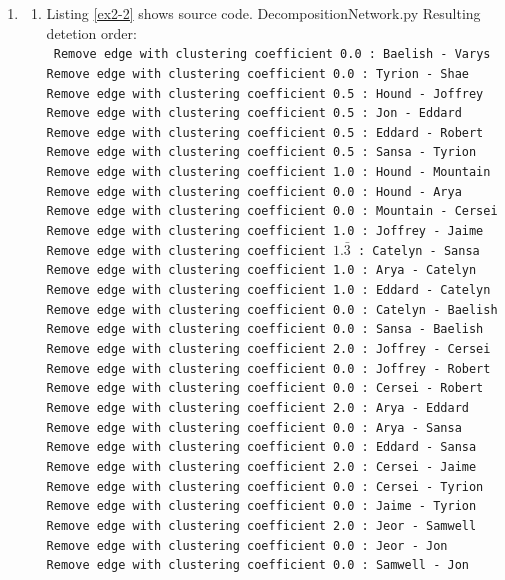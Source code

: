\documentclass[10pt,a4paper]{article}
\begin{document}
\begin{enumerate}
\item
\begin{enumerate}
\item Listing \ref{ex2-2} shows source code.
 {DecompositionNetwork.py}
Resulting detetion order:\\
\texttt{
Remove edge with clustering coefficient 0.0 :	 Baelish - Varys\\
Remove edge with clustering coefficient 0.0 :	 Tyrion - Shae\\
Remove edge with clustering coefficient 0.5 :	 Hound - Joffrey\\
Remove edge with clustering coefficient 0.5 :	 Jon - Eddard\\
Remove edge with clustering coefficient 0.5 :	 Eddard - Robert\\
Remove edge with clustering coefficient 0.5 :	 Sansa - Tyrion\\
Remove edge with clustering coefficient 1.0 :	 Hound - Mountain\\
Remove edge with clustering coefficient 0.0 :	 Hound - Arya\\
Remove edge with clustering coefficient 0.0 :	 Mountain - Cersei\\
Remove edge with clustering coefficient 1.0 :	 Joffrey - Jaime\\
Remove edge with clustering coefficient $1.\bar{3}$ :	 Catelyn - Sansa\\
Remove edge with clustering coefficient 1.0 :	 Arya - Catelyn\\
Remove edge with clustering coefficient 1.0 :	 Eddard - Catelyn\\
Remove edge with clustering coefficient 0.0 :	 Catelyn - Baelish\\
Remove edge with clustering coefficient 0.0 :	 Sansa - Baelish\\
Remove edge with clustering coefficient 2.0 :	 Joffrey - Cersei\\
Remove edge with clustering coefficient 0.0 :	 Joffrey - Robert\\
Remove edge with clustering coefficient 0.0 :	 Cersei - Robert\\
Remove edge with clustering coefficient 2.0 :	 Arya - Eddard\\
Remove edge with clustering coefficient 0.0 :	 Arya - Sansa\\
Remove edge with clustering coefficient 0.0 :	 Eddard - Sansa\\
Remove edge with clustering coefficient 2.0 :	 Cersei - Jaime\\
Remove edge with clustering coefficient 0.0 :	 Cersei - Tyrion\\
Remove edge with clustering coefficient 0.0 :	 Jaime - Tyrion\\
Remove edge with clustering coefficient 2.0 :	 Jeor - Samwell\\
Remove edge with clustering coefficient 0.0 :	 Jeor - Jon\\
Remove edge with clustering coefficient 0.0 :	 Samwell - Jon}


\end{enumerate}
\end{enumerate}
\end{document}

